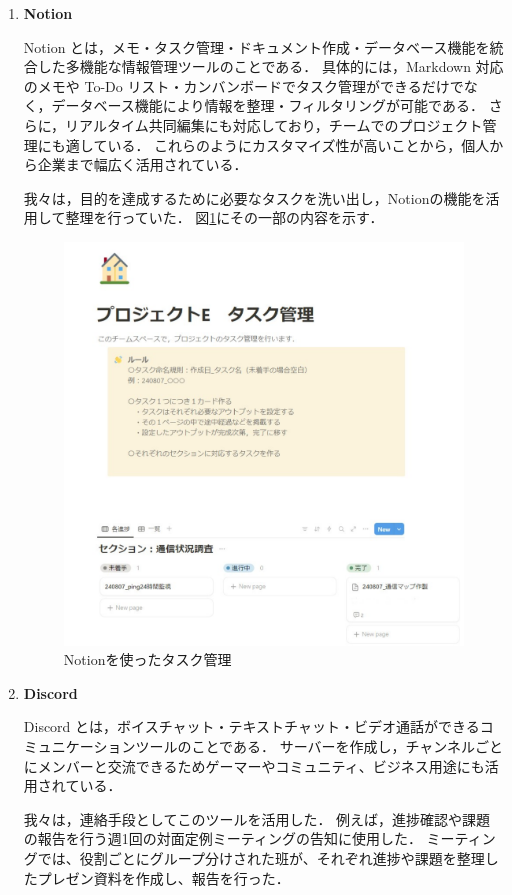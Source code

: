 \begin{enumerate}
	\item \textbf{Notion}
	
	Notion とは，メモ・タスク管理・ドキュメント作成・データベース機能を統合した多機能な情報管理ツールのことである\cite{Notion}．
	具体的には，Markdown 対応のメモや To-Do リスト・カンバンボードでタスク管理ができるだけでなく，データベース機能により情報を整理・フィルタリングが可能である．
	さらに，リアルタイム共同編集にも対応しており，チームでのプロジェクト管理にも適している．
	これらのようにカスタマイズ性が高いことから，個人から企業まで幅広く活用されている．
	
	我々は，目的を達成するために必要なタスクを洗い出し，Notionの機能を活用して整理を行っていた．
	図\ref{fig:Notionを使ったタスク管理}にその一部の内容を示す．
	\begin{figure}[tb]
		\centering
		\includegraphics[scale=0.45]{./fig/notion.pdf}
		\caption{Notionを使ったタスク管理}
		\label{fig:Notionを使ったタスク管理}
	\end{figure}
	
	\item \textbf{Discord}
	
	Discord とは，ボイスチャット・テキストチャット・ビデオ通話ができるコミュニケーションツールのことである\cite{Discord}．
	サーバーを作成し，チャンネルごとにメンバーと交流できるためゲーマーやコミュニティ、ビジネス用途にも活用されている．
	
	我々は，連絡手段としてこのツールを活用した．
	例えば，進捗確認や課題の報告を行う週1回の対面定例ミーティングの告知に使用した．
	ミーティングでは、役割ごとにグループ分けされた班が、それぞれ進捗や課題を整理したプレゼン資料を作成し、報告を行った．
\end{enumerate}

